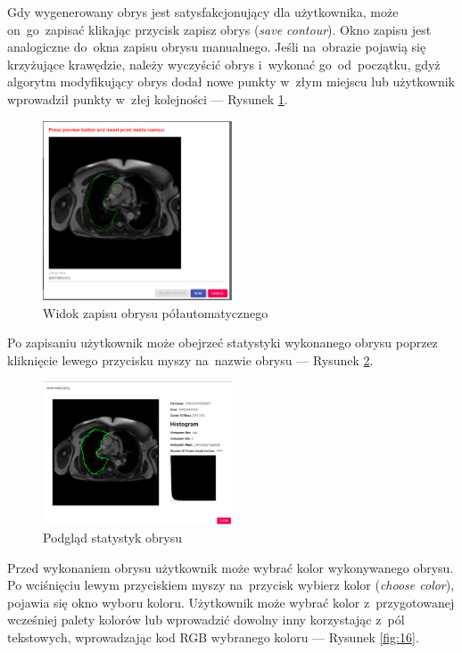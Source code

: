 \documentclass[a4paper,11pt,twoside,openright]{report}
\theoremstyle{definition}
\begin{document}
\pagebreak

Gdy wygenerowany obrys jest satysfakcjonujący dla użytkownika, może on~go~zapisać
klikając przycisk zapisz obrys (\textit{save contour}). Okno zapisu jest analogiczne do~okna zapisu
obrysu manualnego. Jeśli na~obrazie pojawią się krzyżujące krawędzie, należy
wyczyścić obrys i~wykonać go~od~początku, gdyż algorytm modyfikujący obrys dodał
nowe punkty w~złym miejscu lub użytkownik wprowadził punkty w~złej kolejności
--- Rysunek \ref{fig:14}.

\begin{figure}[h!]
	\center
	\includegraphics[width=0.5\textwidth]{14}
	\caption{Widok zapisu obrysu półautomatycznego}
    	\label{fig:14}
\end{figure}

Po zapisaniu użytkownik może obejrzeć statystyki wykonanego obrysu poprzez
kliknięcie lewego przycisku myszy na~nazwie obrysu --- Rysunek \ref{fig:15}.

\begin{figure}[h!]
	\center
	\includegraphics[width=0.5\textwidth]{15}
	\caption{Podgląd statystyk obrysu}
    	\label{fig:15}
\end{figure}

\pagebreak

Przed wykonaniem obrysu użytkownik może wybrać kolor wykonywanego obrysu.
Po wciśnięciu lewym przyciskiem myszy na~przycisk wybierz kolor (\textit{choose color}),
pojawia się okno wyboru koloru. Użytkownik może wybrać kolor z~przygotowanej
wcześniej palety kolorów lub wprowadzić dowolny inny korzystając z~pól tekstowych,
wprowadzając kod RGB wybranego koloru --- Rysunek \ref{fig:16}.
\end{document}

